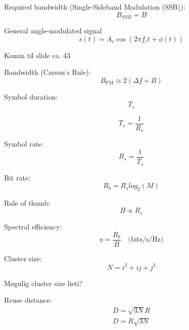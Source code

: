 Required bandwidth (Single-Sideband Modulation (SSB)):
\begin{equation}
  \label{eq:bssb}
  B_{SSB} = B
\end{equation}

General angle-modulated signal
\begin{equation}
  \label{eq:gen:angle:mod:signal}
  s(t) = A_c \cos\left(2\pi f_c t + \phi(t)\right)
\end{equation}

Komin til slide ca. 43

Bandwidth (Carson's Rule):
\begin{equation}
  \label{eq:carsons:rule}
  B_{\text{FM}} \approx 2(\Delta f + B)
\end{equation}

Symbol duration:
\begin{equation}
  \label{eq:symbol:duration}
  T_s
\end{equation}

\begin{equation}
  \label{eq:ts}
  T_s = \frac{1}{R_s}
\end{equation}

Symbol rate:
\begin{equation}
  \label{eq:rs}
  R_s = \frac{1}{T_s}
\end{equation}

Bit rate:
\begin{equation}
  \label{eq:bit:rate}
  R_b = R_s log_2(M)
\end{equation}

Rule of thumb:
$$B \propto R_s$$

Spectral efficiency:
\begin{equation}
  \label{eq:spectral:efficiency}
  \eta = \frac{R_b}{B} \quad \text{(bits/s/Hz)}
\end{equation}

Cluster size:
\begin{equation}
  \label{eq:cluster:size}
  N = i^2 + ij + j^2
\end{equation}

Møgulig cluster size listi?

Reuse distance:
\begin{equation}
  \label{eq:reuse:distance}
  \begin{split}
  D=\sqrt{3N}R\\
  D=R\sqrt{3N}
  \end{split}
\end{equation}

